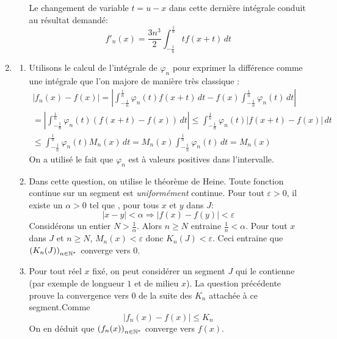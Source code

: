 \begin{enumerate}
\begin{enumerate}
\begin{displaymath}
\end{displaymath}
Le changement de variable $t=u-x$ dans cette dernière intégrale conduit au résultat demandé:
\begin{displaymath}
 f'_n(x)=\frac{3n^3}{2}\int_{-\frac{1}{n}}^{\frac{1}{n}}tf(x+t)\,dt
\end{displaymath}
\end{enumerate}
\item \begin{enumerate}
 \item Utilisons le calcul de l'intégrale de $\varphi_n$ pour exprimer la différence comme une intégrale que l'on majore de manière très classique :
\begin{multline*}
 |f_n(x)-f(x)|= 
\left\vert 
  \int_{-\frac{1}{n}}^{\frac{1}{n}}\varphi_n(t)f(x+t)\,dt
  - f(x)\int_{-\frac{1}{n}}^{\frac{1}{n}}\varphi_n(t)\,dt
\right\vert \\
= 
\left\vert 
  \int_{-\frac{1}{n}}^{\frac{1}{n}}\varphi_n(t)(f(x+t)-f(x))\,dt
\right\vert
\leq \int_{-\frac{1}{n}}^{\frac{1}{n}}\varphi_n(t)\left\vert f(x+t)-f(x)\right\vert \,dt\\
\leq \int_{-\frac{1}{n}}^{\frac{1}{n}}\varphi_n(t)M_n(x)\,dt 
= M_n(x)\int_{-\frac{1}{n}}^{\frac{1}{n}}\varphi_n(t)\,dt = M_n(x)
\end{multline*}
On a utilisé le fait que $\varphi_n$ est à valeurs positives dans l'intervalle.
\item Dans cette question, on utilise le théorème de Heine. Toute fonction continue sur un segment est \emph{uniformément} continue.\newline
Pour tout $\varepsilon>0$, il existe un $\alpha>0$ tel que , pour tous $x$ et $y$ dans $J$:
\begin{displaymath}
 |x-y|<\alpha \Rightarrow |f(x)-f(y)|<\varepsilon
\end{displaymath}
Considérons un entier $N>\frac{1}{\alpha}$. Alors $n\geq N$ entraine $\frac{1}{n}<\alpha$. 
Pour tout $x$ dans $J$ et $n\geq N$, $M_n(x)<\varepsilon$ donc $K_n(J)<\varepsilon$. Ceci entraine que $\left(K_n(J) \right)_{n\in\mathbb{N}^*}$ converge vers $0$. 
\item Pour tout réel $x$ fixé, on peut considérer un segment $J$ qui le contienne (par exemple de longueur $1$ et de milieu $x$). La question précédente prouve la convergence vers $0$ de la suite des $K_n$ attachée à ce segment.Comme
\begin{displaymath}
 |f_n(x)-f(x)|\leq K_n
\end{displaymath}
On en déduit que $\left(f_n(x) \right)_{n\in\mathbb{N}^*}$ converge vers $f(x)$. 

\end{enumerate}
\end{enumerate}
